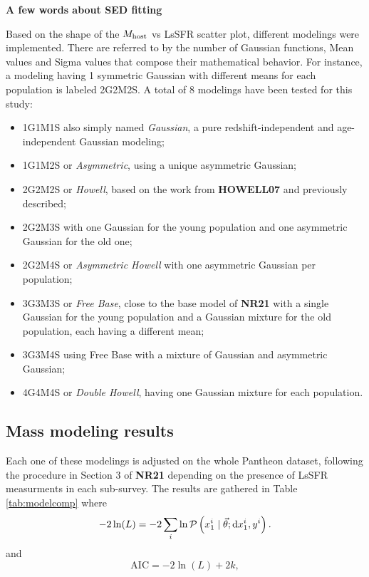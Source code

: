 \documentclass[../main/main.tex]{subfiles}
\begin{document}
\textbf{A few words about SED fitting}

Based on the shape of the $M_{\rm host}$ vs LsSFR scatter plot, different
modelings were implemented. There are referred to by the number of Gaussian
functions, Mean values and Sigma values that compose their mathematical
behavior. For instance, a modeling having 1 symmetric Gaussian with different
means for each population is labeled 2G2M2S. A total of 8 modelings have been
tested for this study:

\begin{itemize}
    \item 1G1M1S also simply named \textit{Gaussian}, a pure
        redshift-independent and age-independent Gaussian modeling;

    \item 1G1M2S or \textit{Asymmetric}, using a unique asymmetric Gaussian;

    \item 2G2M2S or \textit{Howell}, based on the work from \textbf{HOWELL07}
        and previously described;

    \item 2G2M3S with one Gaussian for the young population and one asymmetric
        Gaussian for the old one;

    \item 2G2M4S or \textit{Asymmetric Howell} with one asymmetric Gaussian per
        population;

    \item 3G3M3S or \textit{Free Base}, close to the base model of \textbf{NR21}
        with a single Gaussian for the young population and a Gaussian mixture
        for the old population, each having a different mean;

    \item 3G3M4S using Free Base with a mixture of Gaussian and asymmetric
        Gaussian;

    \item 4G4M4S or \textit{Double Howell}, having one Gaussian mixture for each
        population.
\end{itemize}

\subsection{Mass modeling results}

Each one of these modelings is adjusted on the whole Pantheon dataset,
following the procedure in Section 3 of \textbf{NR21} depending on the presence
of LsSFR measurments in each sub-survey. The results are gathered in Table
\ref{tab:modelcomp} where 
\begin{equation}\label{eq:likelihood}
    -2\ln(L) = -2 \sum_i \ln \mathcal{P}\left(x_1^i \mid \vec{\theta};
    \mathrm{d}x_1^i, y^i\right).
\end{equation}
and 
\begin{equation}
    \mathrm{AIC} = -2\ln(L) + 2k,
\end{equation}
\end{document}

